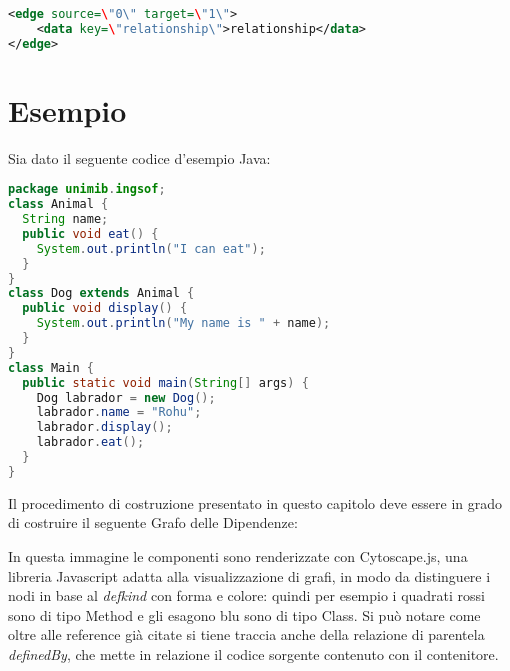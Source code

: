 \begin{lstlisting}[language=XML, caption=esempio di arco]
<edge source=\"0\" target=\"1\">
    <data key=\"relationship\">relationship</data>
</edge>
\end{lstlisting}

\section{Esempio}

Sia dato il seguente codice d'esempio Java:

\begin{lstlisting}[language=Java]
package unimib.ingsof;
class Animal {
  String name;
  public void eat() {
    System.out.println("I can eat");
  }
}
class Dog extends Animal {
  public void display() {
    System.out.println("My name is " + name);
  }
}
class Main {
  public static void main(String[] args) {
    Dog labrador = new Dog();
    labrador.name = "Rohu";
    labrador.display();
    labrador.eat();
  }
}
\end{lstlisting}

Il procedimento di costruzione presentato in questo capitolo deve essere in grado di costruire il seguente Grafo delle Dipendenze:


In questa immagine le componenti sono renderizzate con Cytoscape.js, una libreria Javascript adatta alla visualizzazione di grafi, in modo da distinguere i nodi in base al \emph{defkind} con forma e colore: quindi per esempio i quadrati rossi sono di tipo Method e gli esagono blu sono di tipo Class.
Si pu\`o notare come oltre alle reference gi\`a citate si tiene traccia anche della relazione di parentela \emph{definedBy}, che mette in relazione il codice sorgente contenuto con il contenitore.

